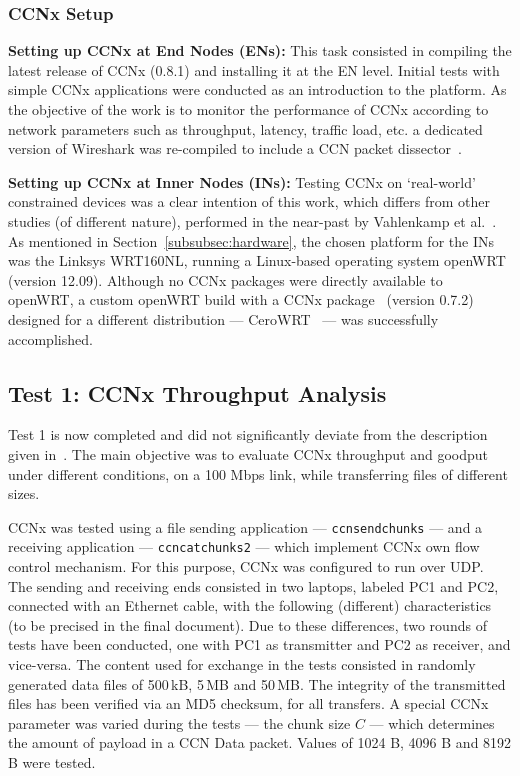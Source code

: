 \subsubsection{CCNx Setup}
\label{subsubsec:ccnx}

\textbf{Setting up CCNx at End Nodes (ENs):} This task 
consisted in compiling the latest release of CCNx (0.8.1) and installing it at 
the EN level. Initial tests with simple CCNx applications were conducted as an 
introduction to the platform. As the objective of the work is to monitor the 
performance of CCNx according to network parameters such as throughput, latency, 
traffic load, etc. a dedicated version of Wireshark was re-compiled to include 
a CCN packet dissector~\cite{website:ccn-wireshark}.\vertbreak

\textbf{Setting up CCNx at Inner Nodes (INs):} Testing CCNx on `real-world' 
constrained devices was a clear 
intention of this work, which differs from other 
studies (of different nature), performed in the near-past by Vahlenkamp et 
al.~\cite{Wahlisch2012, Vahlenkamp2012}. As mentioned in Section~\ref{subsubsec:hardware}, the 
chosen platform for the INs was the Linksys WRT160NL, running a Linux-based 
operating system openWRT (version 12.09). Although no CCNx packages were 
directly available to openWRT, a custom openWRT build with a CCNx package~\cite{website:ccn-openwrt} 
(version 0.7.2) designed for a different distribution --- CeroWRT~\cite{website:cerowrt} --- 
was successfully accomplished.\vertbreak

\subsection{Test 1: CCNx Throughput Analysis}
\label{subsec:ccn-thgpt}

Test 1 is now completed and did not significantly deviate from the description 
given in~\cite{Rodrigues2013b}. The main objective was to evaluate CCNx 
throughput and goodput under different conditions, on a 100 Mbps link, while 
transferring files of different sizes.\vertbreak

CCNx was tested using a file sending application --- \verb+ccnsendchunks+ --- 
and a receiving application --- \verb+ccncatchunks2+ --- which implement CCNx 
own flow control mechanism. For this purpose, CCNx was configured to run over 
UDP. The sending and receiving ends consisted in two laptops, labeled PC1 and 
PC2, connected with an Ethernet cable, with the following (different) 
characteristics (to be precised in the final document). Due to these 
differences, two rounds of tests have been conducted, one with 
PC1 as transmitter and PC2 as receiver, and vice-versa. The content used for 
exchange in the tests consisted in randomly generated data 
files of 500\,kB, 5\,MB and 50\,MB. The integrity of the transmitted files has 
been verified via an MD5 checksum, for all transfers. A special CCNx parameter 
was varied during the tests --- the chunk size $C$ --- which determines the 
amount of payload in a CCN Data packet. Values of 1024 B, 4096 B and 8192 B were 
tested.\vertbreak

